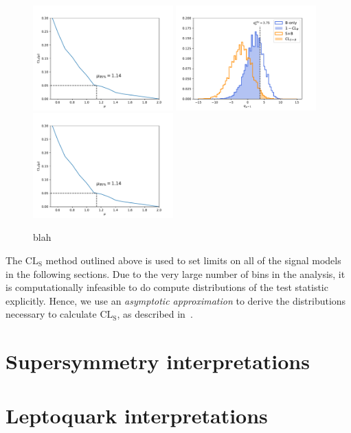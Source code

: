 \begin{figure}[htbp]
  \begin{center}
    \includegraphics[width=0.48\textwidth]{figs/results/cls.pdf}
    \includegraphics[width=0.48\textwidth]{figs/results/qmu_dist.pdf} \\
    \includegraphics[width=0.48\textwidth]{figs/results/cls.pdf}
    \caption{blah
            }
    \label{fig:results_cls}
  \end{center}
\end{figure}

The $\text{CL}_\text{S}$ method outlined above is used to set limits on all of the signal models in the following
sections. Due to the very large number of bins in the \mttwo analysis, it is computationally infeasible
to do compute distributions of the test statistic explicitly. Hence, we use an \textit{asymptotic approximation} to
derive the distributions necessary to calculate $\text{CL}_\text{S}$, as described in~\cite{Cowan:asymptotic}.


\section{Supersymmetry interpretations}
\label{sec:susy_interp}

\section{Leptoquark interpretations}
\label{sec:lq_interp}
